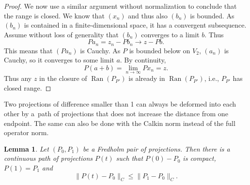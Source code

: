 \documentclass[10pt,a4paper]{amsart}
\numberwithin{equation}{section}
\newtheorem{Lemma}[Theorem]{Lemma}
\DeclareMathOperator{\Ran}{Ran}
\begin{document}
\begin{proof}
		We now use a similar argument without normalization to conclude that the range is closed. We know that $(x_n)$ and thus also $(b_n)$ is bounded. As $(b_n)$ is contained in a finite-dimensional space, it has a convergent subsequence. Assume without loss of generality that $(b_n)$ converges to a limit $b$. Thus
		\[Pa_n=z_n-Pb_n\rightarrow z-P b.\]
		This means that $\left(Pa_n\right)$ is Cauchy. As $P$ is bounded below on $V_2$, $(a_n)$ is Cauchy, so it converges to some limit $a$. By continuity,
		\[P(a+b)=\lim\limits_{n\rightarrow\infty} Px_n=z.\]
		Thus any $z$ in the closure of $\Ran(P_{P'})$ is already in $\Ran(P_{P'})$, i.e., $P_{P'}$ has closed range.
	\end{proof}

	Two projections of difference smaller than 1 can always be deformed into each other by a~path of projections that does not increase the distance from one endpoint. The same can also be done with the Calkin norm instead of the full operator norm.
	\begin{Lemma}
		\label{PPath}
		Let $(P_0,P_1)$ be a Fredholm pair of projections. Then there is a continuous path of projections $P(t)$ such that $P(0)-P_0$ is compact, $P(1)=P_1$ and
		\[\|P(t)-P_0\|_C\leq \|P_1-P_0\|_C.\]
	\end{Lemma}
\end{document}
